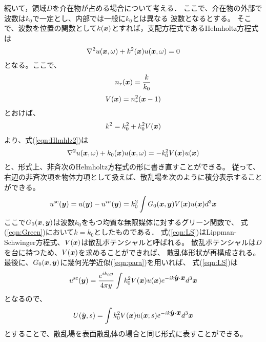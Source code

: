 \documentclass[10pt,a4j,dvipdfmx]{jarticle}
\begin{document}
続いて，領域$D$を介在物が占める場合について考える．
ここで、介在物の外部で波数は$k_0$で一定とし、内部では一般に$k_0$とは異なる
波数となるとする。
そこで、波数を位置の関数として$k(\mbox{\boldmath $x$})$とすれば，支配方程式であるHelmholtz方程式は
\begin{equation}
	\nabla^2 u(\mbox{\boldmath $x$},\omega) + k^2(\mbox{\boldmath $x$}) u(\mbox{\boldmath $x$},\omega) =0
	\label{eqn:Hlmhlz2}
\end{equation}
となる。ここで、
\begin{equation}
	n_r(\mbox{\boldmath $x$}) =\frac{k}{k_0}
	\label{eqn:}
\end{equation}
\begin{equation}
	V(\mbox{\boldmath $x$})=n_r^2(\mbox{\boldmath $x$}-1)
	\label{eqn:}
\end{equation}
とおけば、
\begin{equation}
	k^2=k_0^2 + k_0^2 V(\mbox{\boldmath $x$})
	\label{eqn:}
\end{equation}
より、式(\ref{eqn:Hlmhlz2})は
\begin{equation}
	\nabla^2 u(\mbox{\boldmath $x$},\omega) + k_0(\mbox{\boldmath $x$}) u(\mbox{\boldmath $x$},\omega) = -k_0^2 V(\mbox{\boldmath $x$})u(\mbox{\boldmath $x$})
	\label{eqn:Hlmhlz3}
\end{equation}
と、形式上、非斉次のHelmholtz方程式の形に書き直すことができる。
従って、右辺の非斉次項を物体力項として扱えば、散乱場を次のように積分表示することができる。
\begin{equation}
	u^{\rm sc}(\mbox{\boldmath $y$})=u(\mbox{\boldmath $y$})-u^{in}(\mbox{\boldmath $y$}) = k_0^2\int G_0(\mbox{\boldmath $x$},\mbox{\boldmath $y$})V(\mbox{\boldmath $x$})u(\mbox{\boldmath $x$}) d^3\mbox{\boldmath $x$}
	\label{eqn:LS}
\end{equation}
ここで$G_0(\mbox{\boldmath $x$},\mbox{\boldmath $y$})$は波数$k_0$をもつ均質な無限媒体に対するグリーン関数で、
式(\ref{eqn:Green})において$k=k_0$としたものである．
式(\ref{eqn:LS})はLippman-Schwinger方程式、$V(\mbox{\boldmath $x$})$は散乱ポテンシャルと呼ばれる。
散乱ポテンシャルは$D$を台に持つため、$V(\mbox{\boldmath $x$})$を求めることができれば、
散乱体形状が再構成される。
最後に、$G_0(\mbox{\boldmath $x$},\mbox{\boldmath $y$})$に幾何光学近似(\ref{eqn:para})を用いれば、
式(\ref{eqn:LS})は
\begin{equation}
	u^{\rm sc}(\mbox{\boldmath $y$})
	=
	\frac{e^{ik_0y}}{4\pi y}
	\int
	k_0^2 V(\mbox{\boldmath $x$})u(\mbox{\boldmath $x$}) e^{-ik\hat{\mbox{\boldmath $y$}}\cdot \mbox{\boldmath $x$}}d^3\mbox{\boldmath $x$}
	\label{eqn:}
\end{equation}
となるので、
\begin{equation}
	U(\hat{\mbox{\boldmath $y$}},s)
	=
	\int
	k_0^2 V(\mbox{\boldmath $x$})u(\mbox{\boldmath $x$};s) e^{-ik\hat{\mbox{\boldmath $y$}}\cdot \mbox{\boldmath $x$}}d^3\mbox{\boldmath $x$}
	\label{eqn:U_vol}
\end{equation}
とすることで、散乱場を表面散乱体の場合と同じ形式に表すことができる。
%
\end{document}
